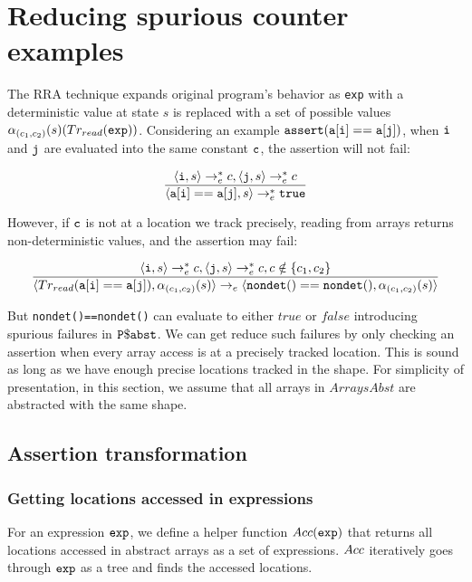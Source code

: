 \section{Reducing spurious counter examples}

The RRA technique expands original program's behavior as {\tt exp}
with a deterministic value at state \(s\) is replaced with a set of
possible values \(\alpha_{(c_1,c_2)}(s)(Tr_{read}({\tt exp}))\). Considering an
example \({\tt assert(a[i]==a[j])}\), when \({\tt i}\) and \({\tt j}\)
are evaluated into the same constant \({\tt c}\), the assertion will
not fail:

\[\frac{{\langle {\tt i}, s \rangle \rightarrow_{e}^{*} c}, {\langle {\tt j}, s \rangle \rightarrow_{e}^{*} c}}{\langle {\tt a[i]==a[j]}, s \rangle \rightarrow_{e}^{*} {\tt true}}\]

However, if \({\tt c}\) is not at a location we track precisely, reading from arrays returns non-deterministic values, 
and the assertion may fail:

\[\frac{{\langle {\tt i}, s \rangle \rightarrow_{e}^{*} c}, {\langle {\tt j}, s \rangle \rightarrow_{e}^{*} c}, c\notin\{c_1, c_2\}}{\langle Tr_{read}({\tt a[i]==a[j]}), \alpha_{(c_1,c_2)}(s) \rangle \rightarrow_{e} \langle{\tt nondet()==nondet()}, \alpha_{(c_1,c_2)}(s)\rangle}\]

But {\tt nondet()==nondet()} can evaluate to either \(true\) or
\(false\) introducing spurious failures in \({\tt P\$abst}\). We can
get reduce such failures by only checking an assertion when every
array access is at a precisely tracked location. This is sound as long
as we have enough precise locations tracked in the shape. For
simplicity of presentation, in this section, we assume that all arrays
in \(ArraysAbst \) are abstracted with the same shape.

\subsection{Assertion transformation}
\subsubsection{Getting locations accessed in expressions} For an expression \({\tt exp}\), we define a helper function \(Acc({\tt exp})\) 
that returns all locations accessed in abstract arrays as a set of expressions. \(Acc\) iteratively goes through \({\tt exp}\) as a tree and 
finds the accessed locations.

